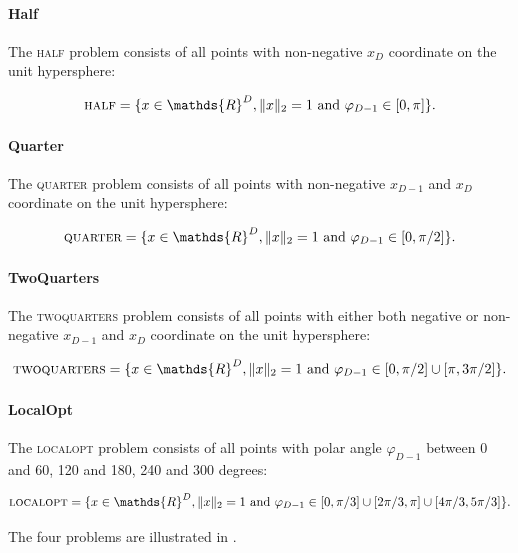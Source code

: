 \paragraph{Half}
The \textsc{half} problem consists of all points with non-negative $x_D$ coordinate on the unit hypersphere:

\[
    \textsc{half} = \{x \in \mathds{R}^D, \lVert x \rVert_2 = 1 \text{ and } \varphi_{D-1} \in [0, \pi]\}.
\]

\paragraph{Quarter}
The \textsc{quarter} problem consists of all points with non-negative $x_{D-1}$ and $x_D$ coordinate on the unit hypersphere:

\[
    \textsc{quarter} = \{x \in \mathds{R}^D, \lVert x \rVert_2 = 1 \text{ and } \varphi_{D-1} \in [0, \pi / 2]\}.
\]

\paragraph{TwoQuarters}
The \textsc{twoquarters} problem consists of all points with either both negative or non-negative $x_{D-1}$ and $x_D$ coordinate on the unit hypersphere:

\[
    \textsc{twoquarters} = \{x \in \mathds{R}^D, \lVert x \rVert_2 = 1 \text{ and } \varphi_{D-1} \in [0, \pi / 2] \cup [\pi, 3\pi / 2]\}.
\]

\paragraph{LocalOpt}
The \textsc{localopt} problem consists of all points with polar angle $\varphi_{D-1}$ between 0 and 60, 120 and 180, 240 and 300 degrees:

\[
    \textsc{localopt} = \{x \in \mathds{R}^D, \lVert x \rVert_2 = 1 \text{ and } \varphi_{D-1} \in [0, \pi / 3] \cup [2\pi / 3, \pi] \cup [4\pi / 3, 5\pi / 3]\}.
\]

The four problems are illustrated in .

